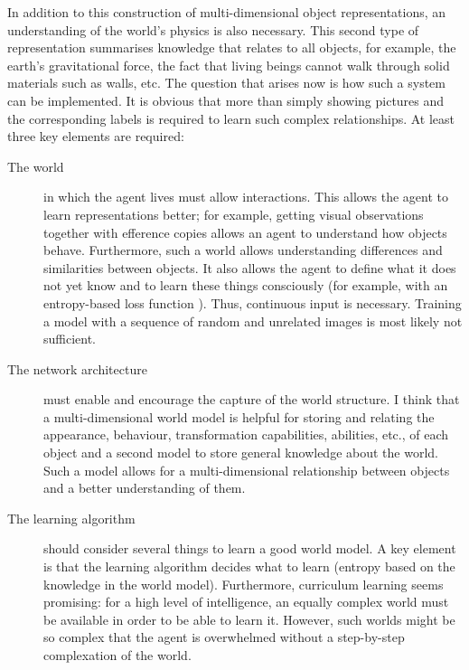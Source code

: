 In addition to this construction of multi-dimensional object representations, an understanding of the world's physics is also necessary. This second type of representation summarises knowledge that relates to all objects, for example, the earth's gravitational force, the fact that living beings cannot walk through solid materials such as walls, etc. The question that arises now is how such a system can be implemented. It is obvious that more than simply showing pictures and the corresponding labels is required to learn such complex relationships. At least three key elements are required:


\begin{description}
	\item[The world] in which the agent lives must allow interactions. This allows the agent to learn representations better; for example, getting visual observations together with efference copies allows an agent to understand how objects behave. Furthermore, such a world allows understanding differences and similarities between objects. It also allows the agent to define what it does not yet know and to learn these things consciously (for example, with an entropy-based loss function ). Thus, continuous input is necessary. Training a model with a sequence of random and unrelated images is most likely not sufficient.
	\item[The network architecture] must enable and encourage the capture of the world structure. I think that a multi-dimensional world model is helpful for storing and relating the appearance, behaviour, transformation capabilities, abilities, etc., of each object and a second model to store general knowledge about the world. Such a model allows for a multi-dimensional relationship between objects and a better understanding of them.%
	\item[The learning algorithm] should consider several things to learn a good world model. A key element is that the learning algorithm decides what to learn (entropy based on the knowledge in the world model). Furthermore, curriculum learning seems promising: for a high level of intelligence, an equally complex world must be available in order to be able to learn it. However, such worlds might be so complex that the agent is overwhelmed without a step-by-step complexation of the world.%
\end{description}

